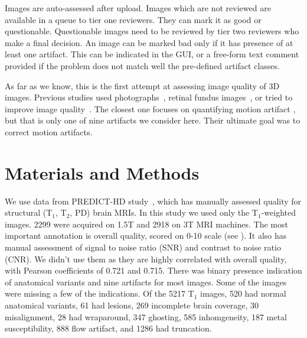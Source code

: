 \documentclass{midl} %
\begin{document}
Images are auto-assessed after upload.
Images which are not reviewed are available in a queue to tier one reviewers. They can mark it as good or questionable. Questionable images need to be reviewed by tier two reviewers who make a final decision. An image can be marked bad only if it has presence of at least one artifact. This can be indicated in the GUI, or a free-form text comment provided if the problem does not match well the pre-defined artifact classes.


As far as we know, this is the first attempt at assessing image quality of 3D images. Previous studies used photographs~\cite{bosse2017deep,hosu2020koniq}, retinal fundus images~\cite{yu2017image},
or tried to improve image quality~\cite{higaki2019improvement}. The closest one focuses on quantifying motion artifact \cite{butskova2021adversarial}, but that is only one of nine artifacts we consider here. Their ultimate goal was to correct motion artifacts.

\section{Materials and Methods}

We use data from PREDICT-HD study~\cite{paulsen2014clinical}, which has manually assessed quality for structural (T$_1$, T$_2$, PD) brain MRIs. In this study we used only the T$_1$-weighted images. 2299 were acquired on 1.5T and 2918 on 3T MRI machines. The most important annotation is overall quality, scored on 0-10 scale (see ). It also has manual assessment of signal to noise ratio (SNR) and contrast to noise ratio (CNR). We didn't use them as they are highly correlated with overall quality, with Pearson coefficients of 0.721 and 0.715.
There was binary presence indication of anatomical variants and nine artifacts for most images. Some of the images were missing a few of the indications. Of the 5217 T$_1$ images, 520 had normal anatomical variants, 61 had lesions, 269 incomplete brain coverage, 30 misalignment, 28 had wraparound, 347 ghosting, 585 inhomgeneity, 187 metal susceptibility, 888 flow artifact, and 1286 had truncation.
\end{document}
